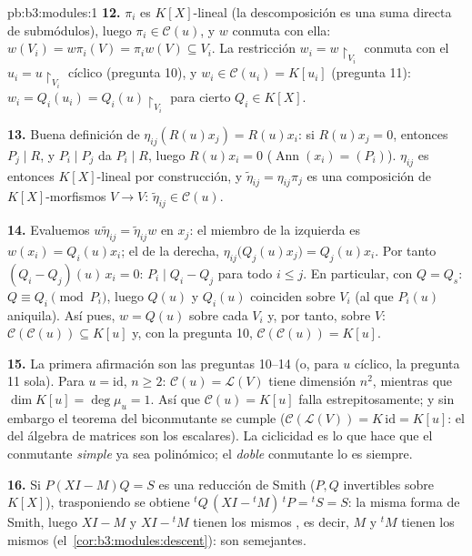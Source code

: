 \begin{solution}{pb:b3:modules:1}
\textbf{12.} $\pi_i$ es $K[X]$-lineal (la descomposición es una suma
directa de submódulos), luego $\pi_i \in \mathcal C(u)$, y $w$ conmuta
con ella: $w(V_i) = w\pi_i(V) = \pi_i w(V) \subseteq
V_i$. La restricción $w_i = w\restriction_{V_i}$ conmuta con el
$u_i = u\restriction_{V_i}$ cíclico (pregunta 10), y $w_i
\in \mathcal C(u_i) = K[u_i]$ (pregunta 11): $w_i = Q_i(u_i) =
Q_i(u)\restriction_{V_i}$ para cierto $Q_i \in K[X]$.

\textbf{13.} Buena definición de $\eta_{ij}(R(u)x_j) = R(u)x_i$: si
$R(u)x_j = 0$, entonces $P_j \mid R$, y $P_i \mid P_j$ da $P_i \mid R$,
luego $R(u)x_i = 0$ ($\operatorname{Ann}(x_i) =
(P_i)$). $\eta_{ij}$ es entonces $K[X]$-lineal por construcción, y
$\tilde\eta_{ij} = \eta_{ij}\pi_j$ es una composición de
$K[X]$-morfismos $V \to V$: $\tilde\eta_{ij} \in \mathcal
C(u)$.

\textbf{14.} Evaluemos $w\tilde\eta_{ij} = \tilde\eta_{ij}w$ en $x_j$:
el miembro de la izquierda es $w(x_i) = Q_i(u)x_i$; el de la derecha,
$\eta_{ij}\bigl(Q_j(u)x_j\bigr) = Q_j(u)x_i$. Por tanto $(Q_i -
Q_j)(u)\,x_i = 0$: $P_i \mid Q_i - Q_j$ para todo $i \leq j$. En
particular, con $Q = Q_s$: $Q \equiv Q_i \pmod{P_i}$, luego $Q(u)$ y
$Q_i(u)$ coinciden sobre $V_i$ (al que $P_i(u)$ aniquila). Así pues, $w
= Q(u)$ sobre cada $V_i$ y, por tanto, sobre $V$:
$\mathcal C(\mathcal C(u))
\subseteq K[u]$ y, con la pregunta 10, $\mathcal C(\mathcal
C(u)) = K[u]$.

\textbf{15.} La primera afirmación son las preguntas 10--14 (o, para $u$
cíclico, la pregunta 11 sola). Para $u = \mathrm{id}$, $n \geq
2$: $\mathcal C(u) = \mathcal L(V)$ tiene dimensión $n^2$, mientras que
$\dim K[u] = \deg\mu_u = 1$. Así que $\mathcal C(u) = K[u]$ falla
estrepitosamente; y sin embargo el teorema del biconmutante se cumple
($\mathcal C(\mathcal L(V)) = K\,\mathrm{id} = K[u]$: el
 del álgebra de matrices son los
escalares). La ciclicidad es lo que hace que el conmutante \emph{simple}
ya sea polinómico; el \emph{doble} conmutante lo es siempre.

\textbf{16.} Si $P(XI - M)Q = S$ es una reducción de Smith ($P, Q$
invertibles sobre $K[X]$), trasponiendo se obtiene ${}^tQ\,(XI -
{}^tM)\,{}^tP = {}^tS = S$: la misma forma de Smith, luego $XI - M$ y
$XI - {}^tM$ tienen los mismos , es decir, $M$ y ${}^tM$ tienen los mismos
(el~\cref{cor:b3:modules:descent}): son semejantes.


\end{solution}
